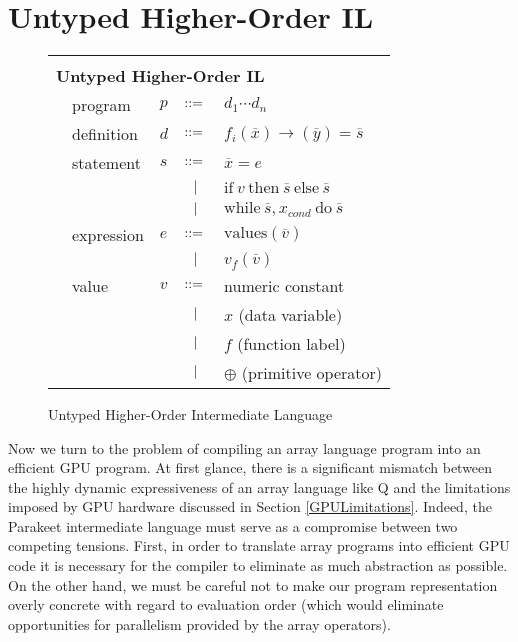 \documentclass[preprint]{sigplanconf}
\begin{document}
\section{Untyped Higher-Order IL}
\begin{figure}[h!]
  \begin{tabular}{| m{0.01cm}m{1.5cm}m{0.1cm}m{0.2cm}p{4.5cm} |}
  \hline
  & & & &\\ 
   \multicolumn{5}{|l|}{\textbf{Untyped Higher-Order IL}}  \\[4pt]
  & program & $p$ &  $::=$   &  $d_1 \cdots d_n $ \\[4pt]
  & definition & $d$ & $::=$ & $f_i(\overline{x}) \rightarrow (\overline{y}) = \overline{s}$ \\[4pt]
  & statement  & $s$ & $::=$ & $\overline{x} = e $\\[2pt]
  &            &     & $\ \ | \ \ $    & $\mathrm{if} ~v~ \mathrm{then} ~ \overline{s} ~ \mathrm{else} ~ \overline{s} $ \\[2pt]
  &            &     & $\ \ | \ \ $    & $\mathrm{while} ~\overline{s}, x_{cond} ~ \mathrm{do} ~\overline{s}~ $  \\[5pt]
  & expression & $e$ & $::=$ & $\mathrm{values} (\overline{v})$ \\[2pt]
  &            &     & $\ \ | \ \ $    & $ v_f (\overline{v}) $ \\[9pt]
  & value      & $v$ & $::=$ & numeric constant \\[2pt]
  &            &     & $\ \ | \ \ $    &  $x$  \quad \small{(data variable)} \\[2pt]
  &            &     & $\ \ | \ \ $    &  $f$  \quad \small{(function label)} \\[2pt]
  &            &     & $\ \ | \ \ $    &  $\oplus$ \quad \small{(primitive operator)} \\[5pt]
  \hline
  \end{tabular}
\caption{Untyped Higher-Order Intermediate Language}
\end{figure}

Now we turn to the problem
of compiling an array language program into an efficient GPU program.
At first glance, there is a significant mismatch between the highly dynamic
expressiveness of an array language like Q and the limitations imposed by GPU
hardware discussed in Section \ref{GPULimitations}. Indeed, the Parakeet
intermediate language must serve as a compromise between two competing tensions.
First, in order to translate array programs into efficient GPU code it is
necessary for the compiler to eliminate as much abstraction as possible. On the
other hand, we must be careful not to make our program representation overly
concrete with regard to evaluation order (which would eliminate opportunities
for parallelism provided by the array operators).
\end{document}
